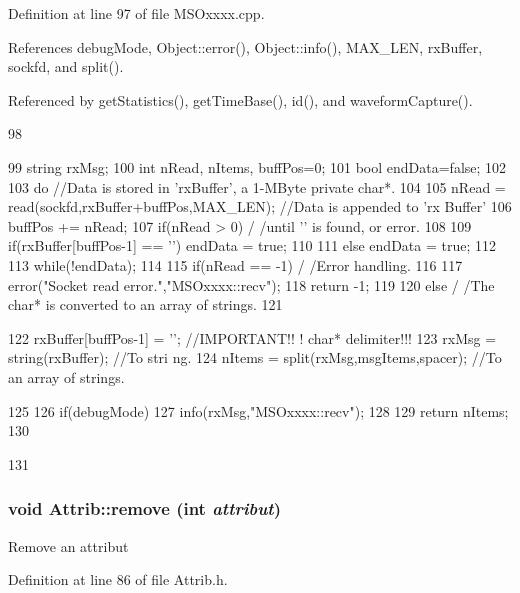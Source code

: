 Definition at line 97 of file MSOxxxx.cpp.

References debugMode, Object::error(), Object::info(), MAX\_\-LEN, rxBuffer, sockfd, and split().

Referenced by getStatistics(), getTimeBase(), id(), and waveformCapture().


\begin{DoxyCode}
98 {
99     string rxMsg;
100     int nRead, nItems, buffPos=0;
101     bool endData=false;
102 
103     do          //Data is stored in 'rxBuffer', a 1-MByte private char*.
104     {
105         nRead = read(sockfd,rxBuffer+buffPos,MAX_LEN);  //Data is appended to 'rx
      Buffer'
106         buffPos += nRead;
107         if(nRead > 0)                                                                       /
      /until '\n' is found, or error.
108         {
109             if(rxBuffer[buffPos-1] == '\n') endData = true;
110         }
111         else endData = true;
112     }
113     while(!endData); 
114 
115     if(nRead == -1)                                                                     /
      /Error handling.
116     {
117         error("Socket read error.","MSOxxxx::recv");
118         return -1;
119     }
120     else                                                                                    /
      /The char* is converted to an array of strings.
121     {
122         rxBuffer[buffPos-1] = '\0';                                 //IMPORTANT!!
      ! char* delimiter!!!
123         rxMsg = string(rxBuffer);                                       //To stri
      ng.
124         nItems = split(rxMsg,msgItems,spacer);          //To an array of strings.
      
125 
126         if(debugMode)
127             info(rxMsg,"MSOxxxx::recv");
128 
129         return nItems;
130     }
131 }
\end{DoxyCode}
\hypertarget{classAttrib_a7d4ef7e32d93cb287792b87b857e79f3}{
\subsubsection[{remove}]{\setlength{\rightskip}{0pt plus 5cm}void Attrib::remove (int {\em attribut})}}
\label{classAttrib_a7d4ef7e32d93cb287792b87b857e79f3}
Remove an attribut 

Definition at line 86 of file Attrib.h.

